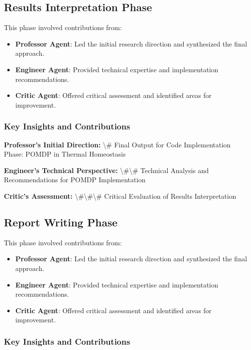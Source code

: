 \documentclass[11pt,a4paper]{article}
\begin{document}
\subsection{Results Interpretation Phase}


This phase involved contributions from:

\begin{itemize}
\item \textbf{Professor Agent}: Led the initial research direction and synthesized the final approach.
\item \textbf{Engineer Agent}: Provided technical expertise and implementation recommendations.
\item \textbf{Critic Agent}: Offered critical assessment and identified areas for improvement.
\end{itemize}

\subsubsection{Key Insights and Contributions}


\textbf{Professor's Initial Direction:} \textbackslash{}# Final Output for Code Implementation Phase: POMDP in Thermal Homeostasis


\textbf{Engineer's Technical Perspective:} \textbackslash{}#\textbackslash{}# Technical Analysis and Recommendations for POMDP Implementation


\textbf{Critic's Assessment:} \textbackslash{}#\textbackslash{}#\textbackslash{}# Critical Evaluation of Results Interpretation


\subsection{Report Writing Phase}


This phase involved contributions from:

\begin{itemize}
\item \textbf{Professor Agent}: Led the initial research direction and synthesized the final approach.
\item \textbf{Engineer Agent}: Provided technical expertise and implementation recommendations.
\item \textbf{Critic Agent}: Offered critical assessment and identified areas for improvement.
\end{itemize}

\subsubsection{Key Insights and Contributions}
\end{document}
